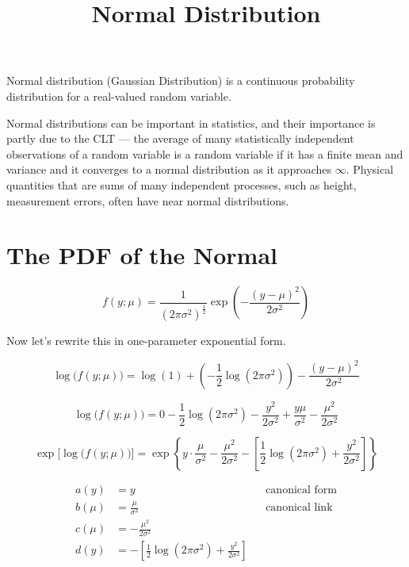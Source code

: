 \documentclass[11pt]{article}
\title{Normal Distribution}
\author{}
\date{}
\begin{document}
\maketitle
\vspace{-2cm}

Normal distribution (Gaussian Distribution) is a continuous probability distribution for a real-valued random variable.

Normal distributions can be important in statistics, and their importance is partly due to the CLT --- the average of many statistically independent observations of a random variable is a random variable if it has a finite mean and variance and it converges to a normal distribution as it approaches $\infty$. Physical quantities that are sums of many independent processes, such as height, measurement errors, often have near normal distributions.

\section*{The PDF of the Normal}

\[
f(y;\mu) = \frac{1}{(2\pi\sigma^2)^{\frac{1}{2}}} \exp\left(-\frac{(y-\mu)^2}{2\sigma^2}\right)
\]

Now let's rewrite this in one-parameter exponential form.

\[
\log\big(f(y;\mu)\big) = \log(1) + \left(-\frac{1}{2}\log(2\pi\sigma^2)\right) - \frac{(y-\mu)^2}{2\sigma^2}
\]

\[
\log\big(f(y;\mu)\big) = 0 - \frac{1}{2}\log(2\pi\sigma^2) - \frac{y^2}{2\sigma^2} + \frac{y\mu}{\sigma^2} - \frac{\mu^2}{2\sigma^2}
\]

\[
\exp\Big[\log\big(f(y;\mu)\big)\Big] = \exp\left\{ y\cdot\frac{\mu}{\sigma^2} - \frac{\mu^2}{2\sigma^2} - \left[\frac{1}{2}\log(2\pi\sigma^2) + \frac{y^2}{2\sigma^2}\right]\right\}
\]

\vspace{0.3cm}
\begin{align*}
a(y) &= y & &\text{canonical form} \\[4pt]
b(\mu) &= \frac{\mu}{\sigma^2} & &\text{canonical link} \\[4pt]
c(\mu) &= -\frac{\mu^2}{2\sigma^2} \\[4pt]
d(y) &= -\left[\frac{1}{2}\log(2\pi\sigma^2) + \frac{y^2}{2\sigma^2}\right]
\end{align*}
\end{document}
